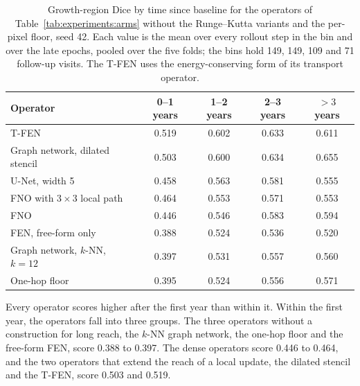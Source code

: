 \begin{table}[h]
  \centering
  \caption[Growth-region Dice by time since baseline.]{%
    Growth-region Dice by time since baseline for the operators of
    Table~\ref{tab:experiments:arms} without the Runge--Kutta variants and
    the per-pixel floor, seed 42. Each value is the mean over every rollout
    step in the bin and over the late epochs, pooled over the five folds;
    the bins hold 149, 149, 109 and 71 follow-up visits. The T-FEN uses
    the energy-conserving form of its transport operator.}
  \label{tab:experiments:horizon}
  \small
  \begin{tabular}{l c c c c}
    \toprule
    Operator & 0--1 years & 1--2 years & 2--3 years & $>3$ years \\
    \midrule
    T-FEN & 0.519 & 0.602 & 0.633 & 0.611 \\
    Graph network, dilated stencil & 0.503 & 0.600 & 0.634 & 0.655 \\
    U-Net, width 5 & 0.458 & 0.563 & 0.581 & 0.555 \\
    FNO with $3 \times 3$ local path & 0.464 & 0.553 & 0.571 & 0.553 \\
    FNO & 0.446 & 0.546 & 0.583 & 0.594 \\
    FEN, free-form only & 0.388 & 0.524 & 0.536 & 0.520 \\
    Graph network, $k$-NN, $k = 12$ & 0.397 & 0.531 & 0.557 & 0.560 \\
    One-hop floor & 0.395 & 0.524 & 0.556 & 0.571 \\
    \bottomrule
  \end{tabular}
\end{table}

Every operator scores higher after the first year than within it. Within
the first year, the operators fall into three groups. The three operators
without a construction for long reach, the $k$-NN graph network, the
one-hop floor and the free-form FEN, score 0.388 to 0.397. The dense operators score 0.446 to 0.464, and the
two operators that extend the reach of a local update, the dilated stencil
and the T-FEN, score 0.503 and 0.519.

